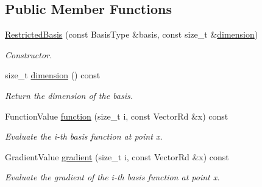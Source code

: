 \subsection*{Public Member Functions}
\begin{DoxyCompactItemize}
\item 
\hyperlink{classHArDCore2D_1_1RestrictedBasis_a3c6a0bd9f6d2d6411762613b363f1716}{Restricted\+Basis} (const Basis\+Type \&basis, const size\+\_\+t \&\hyperlink{classHArDCore2D_1_1RestrictedBasis_a5128f2da3cb58784d6ee7f4dffcacb90}{dimension})
\begin{DoxyCompactList}\small\item\em Constructor. \end{DoxyCompactList}\item 
\mbox{\label{classHArDCore2D_1_1RestrictedBasis_a5128f2da3cb58784d6ee7f4dffcacb90}} 
size\+\_\+t \hyperlink{classHArDCore2D_1_1RestrictedBasis_a5128f2da3cb58784d6ee7f4dffcacb90}{dimension} () const
\begin{DoxyCompactList}\small\item\em Return the dimension of the basis. \end{DoxyCompactList}\item 
\mbox{\label{classHArDCore2D_1_1RestrictedBasis_a1d2d6afdd27878c524490c2e4a9f0bc7}} 
Function\+Value \hyperlink{classHArDCore2D_1_1RestrictedBasis_a1d2d6afdd27878c524490c2e4a9f0bc7}{function} (size\+\_\+t i, const Vector\+Rd \&x) const
\begin{DoxyCompactList}\small\item\em Evaluate the i-\/th basis function at point x. \end{DoxyCompactList}\item 
\mbox{\label{classHArDCore2D_1_1RestrictedBasis_a8e3093c0bd8ca48ef8d37d8f7d302fed}} 
Gradient\+Value \hyperlink{classHArDCore2D_1_1RestrictedBasis_a8e3093c0bd8ca48ef8d37d8f7d302fed}{gradient} (size\+\_\+t i, const Vector\+Rd \&x) const
\begin{DoxyCompactList}\small\item\em Evaluate the gradient of the i-\/th basis function at point x. \end{DoxyCompactList}\item 
\mbox{\label{classHArDCore2D_1_1RestrictedBasis_a81e5a6c78223c5fe9a1e05d47a7798f1}} 

\end{DoxyCompactItemize}
